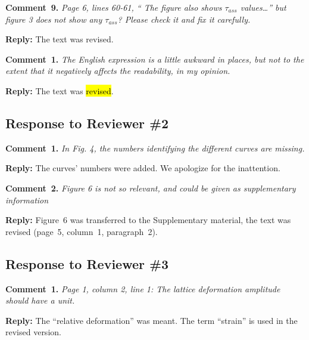 \documentclass[sn-mathphys]{sn-jnl}
\begin{document}
\vspace{1cm}
\noindent
\textcolor[rgb]{0.00,0.50,1.00}{\textbf{Comment~9.}}
\emph{Page 6, lines 60-61, “ The figure also shows $\tau_{ass}$ values…” but figure 3 does not show any $\tau_{ass}$?
Please check it and fix it carefully.}

\noindent
\textcolor[rgb]{0.51,0.00,0.00}{\textbf{Reply:}}
The text was revised.



\noindent
\textcolor[rgb]{0.00,0.50,1.00}{\textbf{Comment~1.}}
\emph{The English expression is a little awkward in places, but not to the extent that it negatively affects the readability, in my opinion.}

\noindent
\textcolor[rgb]{0.51,0.00,0.00}{\textbf{Reply:}}
The text was \hl{revised}.


\subsection*{Response to Reviewer \#2 }

\noindent
\textcolor[rgb]{0.00,0.50,1.00}{\textbf{Comment~1.}}
\emph{In Fig. 4, the numbers identifying the different curves are missing.}

\noindent
\textcolor[rgb]{0.51,0.00,0.00}{\textbf{Reply:}}
The curves' numbers were added.
We apologize for the inattention.


\vspace{1cm}
\noindent
\textcolor[rgb]{0.00,0.50,1.00}{\textbf{Comment~2.}}
\emph{Figure 6 is not so relevant, and could be given as supplementary information}

\noindent
\textcolor[rgb]{0.51,0.00,0.00}{\textbf{Reply:}}
Figure~6 was transferred to the Supplementary material,
the text was revised (page~5, column~1, paragraph~2).


\subsection*{Response to Reviewer \#3 }

\noindent
\textcolor[rgb]{0.00,0.50,1.00}{\textbf{Comment~1.}}
\emph{Page 1, column 2, line 1: The lattice deformation amplitude should have a unit.}

\noindent
\textcolor[rgb]{0.51,0.00,0.00}{\textbf{Reply:}}
The ``relative deformation'' was meant.
The term ``strain'' is used in the revised version.
\end{document}
